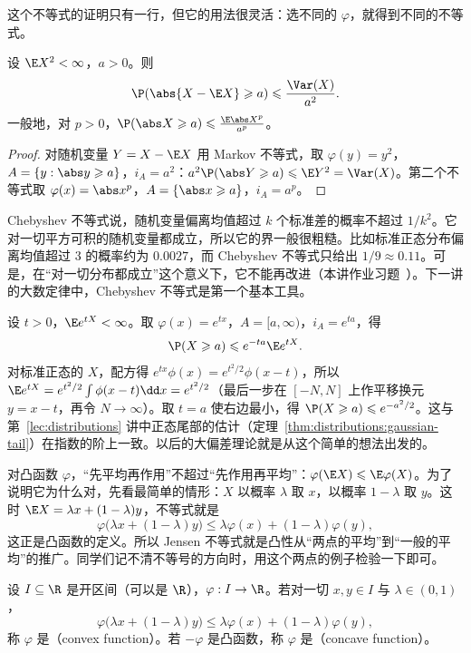这个不等式的证明只有一行，但它的用法很灵活：选不同的 $\varphi$，就得到不同的不等式。

\begin{corollary}\label{cor:expectation:chebyshev}
设 $\E X^2<\infty$，$a>0$。则
\[
\P(\abs{X-\E X}\geqslant a)\leqslant\frac{\Var(X)}{a^2}.
\]
一般地，对 $p>0$，$\P(\abs X\geqslant a)\leqslant\frac{\E\abs X^p}{a^p}$。
\end{corollary}
\begin{proof}
对随机变量 $Y=X-\E X$ 用 Markov 不等式，取 $\varphi(y)=y^2$，$A=\{y:\abs y\geqslant a\}$，$i_A=a^2$：$a^2\P(\abs Y\geqslant a)\leqslant \E Y^2=\Var(X)$。第二个不等式取 $\varphi(x)=\abs x^p$，$A=\{\abs x\geqslant a\}$，$i_A=a^p$。
\end{proof}

Chebyshev 不等式说，随机变量偏离均值超过 $k$ 个标准差的概率不超过 $1/k^2$。它对一切平方可积的随机变量都成立，所以它的界一般很粗糙。比如标准正态分布偏离均值超过 $3$ 的概率约为 $0.0027$，而 Chebyshev 不等式只给出 $1/9\approx0.11$。可是，在“对一切分布都成立”这个意义下，它不能再改进（本讲作业习题~）。下一讲的大数定律中，Chebyshev 不等式是第一个基本工具。

\begin{example}
设 $t>0$，$\E e^{tX}<\infty$。取 $\varphi(x)=e^{tx}$，$A=[a,\infty)$，$i_A=e^{ta}$，得
\[
\P(X\geqslant a)\leqslant e^{-ta}\E e^{tX}.
\]
对标准正态的 $X$，配方得 $e^{tx}\phi(x)=e^{t^2/2}\phi(x-t)$，所以 $\E e^{tX}=e^{t^2/2}\int\phi(x-t)\dd x=e^{t^2/2}$（最后一步在 $[-N,N]$ 上作平移换元 $y=x-t$，再令 $N\to\infty$）。取 $t=a$ 使右边最小，得 $\P(X\geqslant a)\leqslant e^{-a^2/2}$。这与第~\ref{lec:distributions} 讲中正态尾部的估计（定理~\ref{thm:distributions:gaussian-tail}）在指数的阶上一致。以后的大偏差理论就是从这个简单的想法出发的。
\end{example}


对凸函数 $\varphi$，“先平均再作用”不超过“先作用再平均”：$\varphi(\E X)\leqslant \E\varphi(X)$。为了说明它为什么对，先看最简单的情形：$X$ 以概率 $\lambda$ 取 $x$，以概率 $1-\lambda$ 取 $y$。这时 $\E X=\lambda x+(1-\lambda)y$，不等式就是
\[
\varphi\bigl(\lambda x+(1-\lambda)y\bigr)\leqslant\lambda\varphi(x)+(1-\lambda)\varphi(y),
\]
这正是凸函数的定义。所以 Jensen 不等式就是凸性从“两点的平均”到“一般的平均”的推广。同学们记不清不等号的方向时，用这个两点的例子检验一下即可。

\begin{definition}[凸函数]\label{def:expectation:convex}
设 $I\subseteq\R$ 是开区间（可以是 $\R$），$\varphi:I\to\R$。若对一切 $x,y\in I$ 与 $\lambda\in(0,1)$，
\[
\varphi\bigl(\lambda x+(1-\lambda)y\bigr)\leqslant\lambda\varphi(x)+(1-\lambda)\varphi(y),
\]
称 $\varphi$ 是（convex function）。若 $-\varphi$ 是凸函数，称 $\varphi$ 是（concave function）。
\end{definition}

